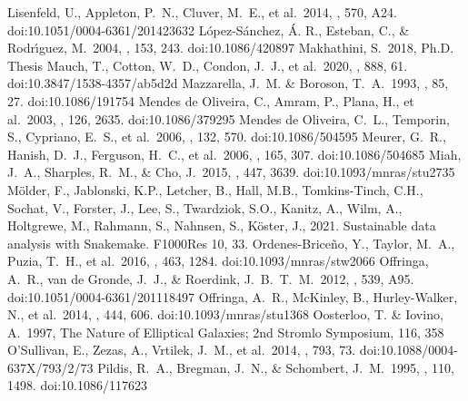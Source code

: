 \documentclass{aa}
\begin{document}
\begin{thebibliography}{}
      Lisenfeld, U., Appleton, P.~N., Cluver, M.~E., et al.\ 2014, \aap, 570, A24. doi:10.1051/0004-6361/201423632
      L{\'o}pez-S{\'a}nchez, {\'A}. R., Esteban, C., \& Rodr{\'\i}guez, M.\ 2004, \apjs, 153, 243. doi:10.1086/420897
      Makhathini, S.\ 2018, Ph.D. Thesis
      Mauch, T., Cotton, W.~D., Condon, J.~J., et al.\ 2020, \apj, 888, 61. doi:10.3847/1538-4357/ab5d2d
      Mazzarella, J.~M. \& Boroson, T.~A.\ 1993, \apjs, 85, 27. doi:10.1086/191754
      Mendes de Oliveira, C., Amram, P., Plana, H., et al.\ 2003, \aj, 126, 2635. doi:10.1086/379295
      Mendes de Oliveira, C.~L., Temporin, S., Cypriano, E.~S., et al.\ 2006, \aj, 132, 570. doi:10.1086/504595
      Meurer, G.~R., Hanish, D.~J., Ferguson, H.~C., et al.\ 2006, \apjs, 165, 307. doi:10.1086/504685
      Miah, J.~A., Sharples, R.~M., \& Cho, J.\ 2015, \mnras, 447, 3639. doi:10.1093/mnras/stu2735
      Mölder, F., Jablonski, K.P., Letcher, B., Hall, M.B., Tomkins-Tinch, C.H., Sochat, V., Forster, J., Lee, S., Twardziok, S.O., Kanitz, A., Wilm, A., Holtgrewe, M., Rahmann, S., Nahnsen, S., Köster, J., 2021. Sustainable data analysis with Snakemake. F1000Res 10, 33.
      Ordenes-Brice{\~n}o, Y., Taylor, M.~A., Puzia, T.~H., et al.\ 2016, \mnras, 463, 1284. doi:10.1093/mnras/stw2066
      Offringa, A.~R., van de Gronde, J.~J., \& Roerdink, J.~B.~T.~M.\ 2012, \aap, 539, A95. doi:10.1051/0004-6361/201118497
      Offringa, A.~R., McKinley, B., Hurley-Walker, N., et al.\ 2014, \mnras, 444, 606. doi:10.1093/mnras/stu1368
      Oosterloo, T. \& Iovino, A.\ 1997, The Nature of Elliptical Galaxies; 2nd Stromlo Symposium, 116, 358
      O'Sullivan, E., Zezas, A., Vrtilek, J.~M., et al.\ 2014, \apj, 793, 73. doi:10.1088/0004-637X/793/2/73
      Pildis, R.~A., Bregman, J.~N., \& Schombert, J.~M.\ 1995, \aj, 110, 1498. doi:10.1086/117623

\end{thebibliography}
\end{document}
